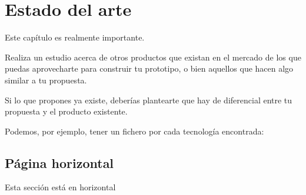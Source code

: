 
\chapter{Estado del arte}

Este capítulo es realmente importante.

Realiza un estudio acerca de otros productos que existan en el mercado de los que puedas aprovecharte para construir tu prototipo, o bien aquellos que hacen algo similar a tu propuesta.

Si lo que propones ya existe, deberías plantearte que hay de diferencial entre tu propuesta y el producto existente.

Podemos, por ejemplo, tener un fichero por cada tecnología encontrada:



\begin{landscape}
    \section{Página horizontal}
    Esta sección está en horizontal
\end{landscape}

